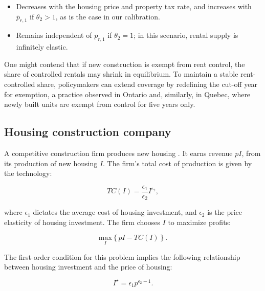 \documentclass[parskip=full]{article}
\begin{document}
\begin{itemize}
    \item Decreases with the housing price and property tax rate, and increases with $\overline{p}_{r,1}$ if $\theta_{2} > 1$, as is the case in our calibration.
    \item Remains independent of $\overline{p}_{r,1}$ if $\theta_{2} = 1$; in this scenario, rental supply is infinitely elastic.
\end{itemize}

One might contend that if new construction is exempt from rent control, the share of controlled rentals may shrink in equilibrium. To maintain a stable rent-controlled share, policymakers can extend coverage by redefining the cut-off year for exemption, a practice observed in Ontario and, similarly, in Quebec, where newly built units are exempt from control for five years only.

\subsection{Housing construction company}\label{sec:construction_company}

A competitive construction firm produces new housing \citep{rotberg-2022}. It earns revenue $pI$, from its production of new housing $I$. The firm's total cost of production is given by the technology:

\begin{equation*}
TC(I)=\frac{\epsilon_{1}}{\epsilon_{2}}I^{\epsilon_{2}}\label{eq:total_cost_structure},
\end{equation*}

\noindent where $\epsilon_{1}$ dictates the average cost of housing investment, and $\epsilon_{2}$ is the price elasticity of housing investment. The firm chooses $I$ to maximize profits:

\begin{equation*}
\label{eq:construction_company_profits}
\underset{I} {\text{$\mbox{max}$}}{\left\{p I-TC(I)\right\}}.
\end{equation*}

\noindent The first-order condition for this problem implies the following relationship between housing investment and the price of housing:

\begin{equation}
\label{eq:construction_company_first_order_condition}
I^{\star}=\epsilon_{1} p^{\epsilon_{2}-1}.
\end{equation}
\end{document}
